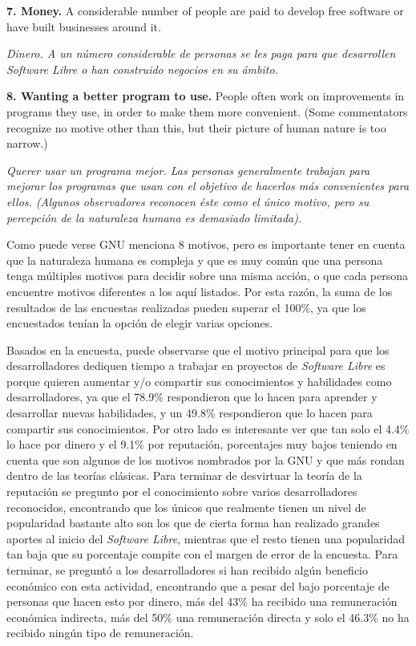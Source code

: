 {\bf 7. Money.} A considerable number of people are paid to develop free software or have built businesses around it.

\textit{Dinero. A un número considerable de personas se les paga para que desarrollen \textit{Software Libre} o han construido negocios en su ámbito.}\vspace{0.4cm} 

{\bf 8. Wanting a better program to use.} People often work on improvements in programs they use, in order to make them more convenient. (Some commentators recognize no motive other than this, but their picture of human nature is too narrow.)

\textit{Querer usar un programa mejor. Las personas generalmente trabajan para mejorar los programas que usan con el objetivo de hacerlos más convenientes para ellos. (Algunos observadores reconocen éste como el único motivo, pero su percepción de la naturaleza humana es demasiado limitada).}\vspace{0.4cm}


Como puede verse GNU menciona 8 motivos, pero es importante tener en cuenta que la naturaleza humana es compleja y que es muy común que una persona tenga múltiples motivos para decidir sobre una misma acción, o que cada persona encuentre motivos diferentes a los aquí listados. Por esta razón, la suma de los resultados de las encuestas realizadas pueden superar el 100\%, ya que los encuestados tenían la opción de elegir varias opciones.

Basados en la encuesta, puede observarse que el motivo principal para que los desarrolladores dediquen tiempo a trabajar en proyectos de \textit{Software Libre} es porque quieren aumentar y/o compartir sus conocimientos y habilidades como desarrolladores, ya que el 78.9\% respondieron que lo hacen para aprender  y desarrollar nuevas habilidades, y un 49.8\% respondieron que lo hacen para compartir sus conocimientos.
Por otro lado es interesante ver que tan solo el 4.4\% lo hace por dinero y el 9.1\% por reputación, porcentajes muy bajos teniendo en cuenta que son algunos de los motivos nombrados por la GNU y que más rondan dentro de las teorías clásicas. 
Para terminar de desvirtuar la teoría de la reputación se pregunto por el  conocimiento sobre varios desarrolladores reconocidos, encontrando que los únicos que realmente tienen un nivel de popularidad bastante alto son los que de cierta forma han realizado grandes aportes al inicio del \textit{Software Libre}, mientras que el resto tienen una popularidad tan baja que su porcentaje compite con el margen de error de la encuesta.
Para terminar, se preguntó a los desarrolladores si han recibido algún beneficio económico con esta actividad, encontrando que a pesar del bajo porcentaje de personas que hacen esto por dinero, más del 43\% ha recibido una remuneración económica indirecta, más del 50\% una remuneración directa y solo el 46.3\% no ha recibido ningún tipo de remuneración.

